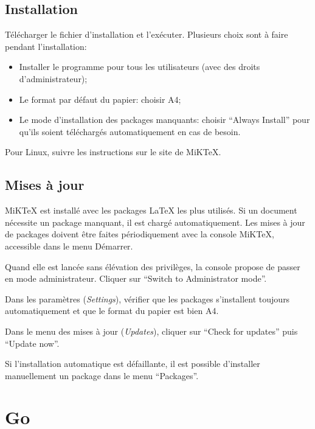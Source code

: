 \documentclass[
  12pt,
  french,
  a4paper,
  extrafontsizes,onecolumn,openright
  ]{memoir}
\providecommand{\tightlist}{%
  \setlength{\itemsep}{0pt}\setlength{\parskip}{0pt}}
\begin{document}
\hypertarget{installation-2}{%
\subsection{Installation}\label{installation-2}}

Télécharger le fichier d'installation et l'exécuter.
Plusieurs choix sont à faire pendant l'installation:

\begin{itemize}
\tightlist
\item
  Installer le programme pour tous les utilisateurs (avec des droits d'administrateur);
\item
  Le format par défaut du papier: choisir A4;
\item
  Le mode d'installation des packages manquants: choisir \enquote{Always Install} pour qu'ils soient téléchargés automatiquement en cas de besoin.
\end{itemize}

Pour Linux, suivre les instructions sur le site de MiKTeX.

\hypertarget{mises-uxe0-jour}{%
\subsection{Mises à jour}\label{mises-uxe0-jour}}

MiKTeX est installé avec les packages LaTeX les plus utilisés.
Si un document nécessite un package manquant, il est chargé automatiquement.
Les mises à jour de packages doivent être faites périodiquement avec la console MiKTeX, accessible dans le menu Démarrer.

Quand elle est lancée sans élévation des privilèges, la console propose de passer en mode administrateur.
Cliquer sur \enquote{Switch to Administrator mode}.

Dans les paramètres (\emph{Settings}), vérifier que les packages s'installent toujours automatiquement et que le format du papier est bien A4.

Dans le menu des mises à jour (\emph{Updates}), cliquer sur \enquote{Check for updates} puis \enquote{Update now}.

Si l'installation automatique est défaillante, il est possible d'installer manuellement un package dans le menu \enquote{Packages}.

\hypertarget{go}{%
\section{Go}\label{go}}
\end{document}
